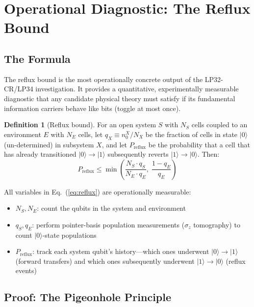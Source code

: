 \documentclass[12pt,a4paper]{article}
\theoremstyle{definition}
\newtheorem{definition}[theorem]{Definition}
\theoremstyle{remark}
\begin{document}
\section{Operational Diagnostic: The Reflux Bound}
\label{sec:reflux}

\subsection{The Formula}

The reflux bound is the most operationally concrete output of the LP32-CR/LP34 investigation. It provides a quantitative, experimentally measurable diagnostic that any candidate physical theory must satisfy if its fundamental information carriers behave like bits (toggle at most once).

\begin{definition}[Reflux bound]
For an open system $S$ with $N_S$ cells coupled to an environment $E$ with $N_E$ cells, let $q_X \equiv n_0^X/N_X$ be the fraction of cells in state $|0\rangle$ (un-determined) in subsystem $X$, and let $P_{\mathrm{reflux}}$ be the probability that a cell that has already transitioned $|0\rangle \to |1\rangle$ subsequently reverts $|1\rangle \to |0\rangle$. Then:
\begin{equation}
\boxed{P_{\mathrm{reflux}} \leq \min\!\left(\frac{N_S \cdot q_S}{N_E \cdot q_E},\; \frac{1-q_E}{q_E}\right)}
\label{eq:reflux}
\end{equation}
\end{definition}

All variables in Eq.~(\ref{eq:reflux}) are operationally measurable:
\begin{itemize}[leftmargin=*,itemsep=0pt,topsep=0pt]
\item $N_S, N_E$: count the qubits in the system and environment
\item $q_S, q_E$: perform pointer-basis population measurements ($\sigma_z$ tomography) to count $|0\rangle$-state populations
\item $P_{\mathrm{reflux}}$: track each system qubit's history---which ones underwent $|0\rangle \to |1\rangle$ (forward transfers) and which ones subsequently underwent $|1\rangle \to |0\rangle$ (reflux events)
\end{itemize}

\subsection{Proof: The Pigeonhole Principle}
\end{document}
